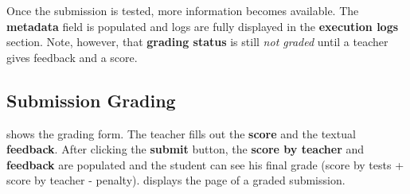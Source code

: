 
Once the submission is tested, more information becomes available. The \textbf{metadata} field is populated and logs are fully displayed in the \textbf{execution logs} section. Note, however, that \textbf{grading status} is still \textit{not graded} until a teacher gives feedback and a score.

\subsection{Submission Grading}
\label{sub-sec:usage-grading}


 shows the grading form. The teacher fills out the \textbf{score} and the textual \textbf{feedback}. After clicking the \textbf{submit} button, the \textbf{score by teacher} and \textbf{feedback} are populated and the student can see his final grade (score by tests + score by teacher - penalty).  displays the page of a graded submission.

